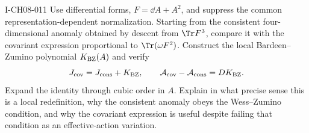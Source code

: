 \begin{exercise}{I-CH08-011}
Use differential forms, $F=\dd A+A^2$, and suppress the common
representation-dependent normalization.  Starting from the consistent
four-dimensional anomaly obtained by descent from $\Tr F^3$, compare it with
the covariant expression proportional to $\Tr(\omega F^2)$.  Construct the
local Bardeen--Zumino polynomial $K_{\rm BZ}(A)$ and verify
\[
 J_{\rm cov}=J_{\rm cons}+K_{\rm BZ},\qquad
 \mathcal A_{\rm cov}-\mathcal A_{\rm cons}=D K_{\rm BZ}.
\]
Expand the identity through cubic order in $A$.  Explain in what precise sense
this is a local redefinition, why the consistent anomaly obeys the
Wess--Zumino condition, and why the covariant expression is useful despite
failing that condition as an effective-action variation.
\end{exercise}
